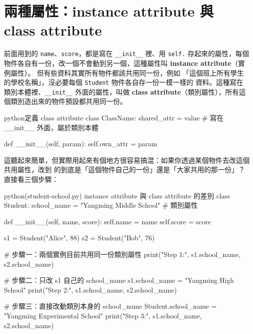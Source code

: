 \section{兩種屬性：instance attribute 與 class attribute}
\label{sec:instance-vs-class-attr}

前面用到的 \texttt{name}、\texttt{score}，都是寫在 \texttt{\_\_init\_\_} 裡、用
\texttt{self.} 存起來的屬性，每個物件各自有一份，改一個不會動到另一個，這種屬性叫
\textbf{instance attribute}（實例屬性）。
但有些資料其實所有物件都該共用同一份，例如
「這個班上所有學生的學校名稱」，沒必要每個 \texttt{Student} 物件各自存一份一模一樣的
資料。這種寫在類別本體裡、\texttt{\_\_init\_\_} 外面的屬性，叫做 \textbf{class
attribute}（類別屬性），所有這個類別造出來的物件預設都共用同一份。

\begin{code}{python}{定義 class attribute}
class ClassName:
    shared_attr = value   # 寫在 __init__ 外面，屬於類別本體

    def __init__(self, param):
        self.own_attr = param
\end{code}

這聽起來簡單，但實際用起來有個地方很容易搞混：如果你透過某個物件去改這個共用屬性，改到
的到底是「這個物件自己的一份」還是「大家共用的那一份」？直接看三個步驟：

\begin{example}{python}{(student-school.py) instance attribute 與 class attribute 的差別}
class Student:
    school_name = "Yangming Middle School"   # 類別屬性

    def __init__(self, name, score):
        self.name = name
        self.score = score


s1 = Student("Alice", 88)
s2 = Student("Bob", 76)

# 步驟一：兩個實例目前共用同一份類別屬性
print("Step 1:", s1.school_name, s2.school_name)

# 步驟二：只改 s1 自己的 school_name
s1.school_name = "Yangming High School"
print("Step 2:", s1.school_name, s2.school_name)

# 步驟三：直接改動類別本身的 school_name
Student.school_name = "Yangming Experimental School"
print("Step 3:", s1.school_name, s2.school_name)
\end{example}


